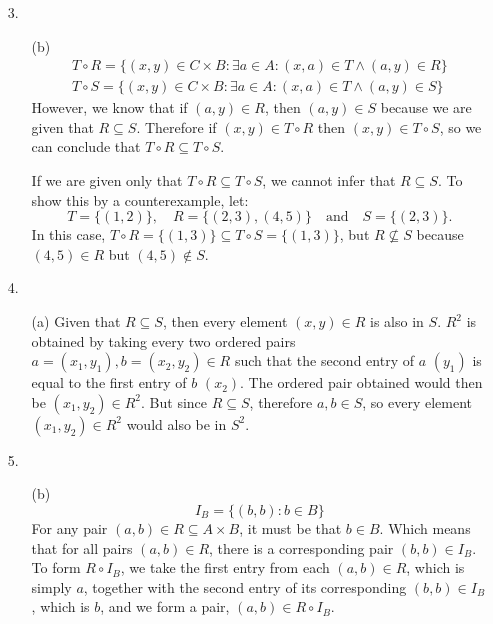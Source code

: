 \documentclass[fleqn]{article}
\begin{document}
\begin{enumerate}
    \item[3.]
	\begin{enumerate}
		\item[(b)]
		\begin{gather*}
			T \circ R = \{(x, y) \in C \times B : \exists a \in A : (x, a) \in T \land (a, y) \in R\} \label{1}\\
			T \circ S = \{(x, y) \in C \times B : \exists a \in A : (x, a) \in T \land (a, y) \in S\} \label{2}
		\end{gather*}
		However, we know that if \((a, y) \in R\), then \((a, y) \in S\) because we are given that \(R \subseteq S\). Therefore if \((x, y) \in T \circ R\) then \((x, y) \in T \circ S\), so we can conclude that \(T \circ R \subseteq T \circ S\).

		If we are given only that \(T \circ R \subseteq T \circ S\), we cannot infer that \(R \subseteq S\). To show this by a counterexample, let:
		\[T = \{(1, 2)\}, \quad R = \{(2, 3), (4, 5)\} \quad \text{and} \quad S = \{(2, 3)\}. \]
		In this case, \(T \circ R = \{(1, 3)\} \subseteq T \circ S = \{(1, 3)\}\), but \(R \nsubseteq S\) because \((4, 5) \in R\) but \((4, 5) \notin S\).
	\end{enumerate}

    \item[4.]
	\begin{enumerate}
		\item[(a)]
		Given that \(R \subseteq S\), then every element \((x, y) \in R\) is also in \(S\). \(R^2\) is obtained by taking every two ordered pairs \(a = (x_1, y_1), b = (x_2, y_2) \in R\) such that the second entry of \(a\) \((y_1)\) is equal to the first entry of \(b\) \((x_2)\). The ordered pair obtained would then be \((x_1, y_2) \in R^2\). But since \(R \subseteq S\), therefore \(a, b \in S\), so every element \((x_1, y_2) \in R^2\) would also be in \(S^2\).
	\end{enumerate}
	
    \item[5.]
	\begin{enumerate}
		\item[(b)]
		\[I_B = \{(b, b) : b \in B\}\]
		For any pair \((a, b) \in R \subseteq A \times B\), it must be that \(b \in B\). Which means that for all pairs \((a, b) \in R\), there is a corresponding pair \((b, b) \in I_B\). To form \(R \circ I_B\), we take the first entry from each \((a, b) \in R\), which is simply \(a\), together with the second entry of its corresponding \((b, b) \in I_B\), which is \(b\), and we form a pair, \((a, b) \in R \circ I_B\).


\end{enumerate}
\end{enumerate}
\end{document}
